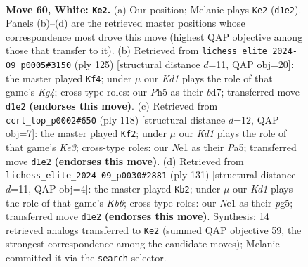 \documentclass[11pt]{article}
\begin{document}
\clearpage

\begin{figure}[p]\centering
\begin{subfigure}{0.46\textwidth}\centering
\resizebox{\linewidth}{!}{%
\newchessgame
\chessboard[
  setfen={8/8/7R/2pk3P/8/8/1P6/3KNr2 w - - 2 60},
  showmover=false,
  pgfstyle=straightmove, color=movearrow, markmove={d1-e2}
]}
\caption{}
\end{subfigure}\hfill
\begin{subfigure}{0.46\textwidth}\centering
\resizebox{\linewidth}{!}{%
\newchessgame
\chessboard[
  setfen={7r/3B4/6p1/3KP1k1/8/6n1/8/6R1 b - - 28 63},
  showmover=false,
  pgfstyle=straightmove, color=movearrow, markmove={g5-f4}
]}
\caption{}
\end{subfigure}
\\[4pt]
\begin{subfigure}{0.46\textwidth}\centering
\resizebox{\linewidth}{!}{%
\newchessgame
\chessboard[
  setfen={8/8/5pk1/P1R5/r7/4K3/7P/8 w - - 0 60},
  showmover=false,
  pgfstyle=straightmove, color=movearrow, markmove={e3-f2}
]}
\caption{}
\end{subfigure}\hfill
\begin{subfigure}{0.46\textwidth}\centering
\resizebox{\linewidth}{!}{%
\newchessgame
\chessboard[
  setfen={8/8/5P2/4K1Pp/7r/pk6/8/R7 b - - 0 66},
  showmover=false,
  pgfstyle=straightmove, color=movearrow, markmove={b3-b2}
]}
\caption{}
\end{subfigure}
\caption{\textbf{Move 60, White: \texttt{Ke2}.} (a) Our position; Melanie plays \texttt{Ke2} (\texttt{d1e2}). Panels (b)--(d) are the retrieved master positions whose correspondence most drove this move (highest QAP objective among those that transfer to it). (b) Retrieved from \texttt{lichess\_elite\_2024-09\_p0005\#3150} (ply 125) [structural distance $d$=11, QAP obj=20]: the master played \texttt{Kf4}; under $\mu$ our \emph{Kd1} plays the role of that game's \emph{Kg4}; cross-type roles: our \emph{P}h5 as their \emph{b}d7; transferred move \texttt{d1e2} \textbf{(endorses this move)}. (c) Retrieved from \texttt{ccrl\_top\_p0002\#650} (ply 118) [structural distance $d$=12, QAP obj=7]: the master played \texttt{Kf2}; under $\mu$ our \emph{Kd1} plays the role of that game's \emph{Ke3}; cross-type roles: our \emph{N}e1 as their \emph{P}a5; transferred move \texttt{d1e2} \textbf{(endorses this move)}. (d) Retrieved from \texttt{lichess\_elite\_2024-09\_p0030\#2881} (ply 131) [structural distance $d$=11, QAP obj=4]: the master played \texttt{Kb2}; under $\mu$ our \emph{Kd1} plays the role of that game's \emph{Kb6}; cross-type roles: our \emph{N}e1 as their \emph{p}g5; transferred move \texttt{d1e2} \textbf{(endorses this move)}. Synthesis: 14 retrieved analogs transferred to \texttt{Ke2} (summed QAP objective 59, the strongest correspondence among the candidate moves); Melanie committed it via the \texttt{search} selector.}
\label{fig:thought-m118}
\end{figure}
\end{document}
